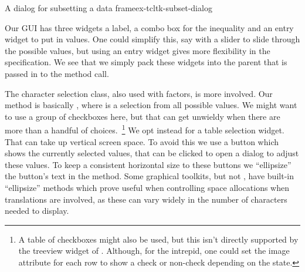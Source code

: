 \begin{example}{A dialog for subsetting a data frame}{ex-tcltk-subset-dialog}
\begin{Schunk}
\begin{Sinput}
\end{Sinput}
\end{Schunk}
%

Our GUI has three widgets a label, a combo box for the inequality
and an entry widget to put in values. One could simplify this, say
with a slider to slide through the possible values, but using an
entry widget gives more flexibility in the specification. We see that
we simply pack these widgets into the parent that is passed in to the method call.
\begin{Schunk}
\end{Schunk}
%


The character selection class, also used with factors, is more
involved. Our  method is basically , where  is a selection from all possible
values.  We might want to use a group of checkboxes here, but that can
get unwieldy when there are more than a handful of
choices.~\footnote{A table of checkboxes might also be used, but this
  isn't directly supported by the treeview widget of
  . Although, for the intrepid, one could set the image
  attribute for each row to show a check or non-check depending on the
  state.} We opt instead for a table selection widget. That can take
up vertical screen space. To avoid this we use a button which shows
the currently selected values, that can be clicked to open a dialog to
adjust these values. To keep a consistent horizontal size to these
buttons we ``ellipsize'' the button's text in the 
method. Some graphical toolkits, but not \Tk, have built-in
``ellipsize'' methods which prove useful when controlling space
allocations when translations are involved, as these can vary widely
in the number of characters needed to display.


\end{example}
